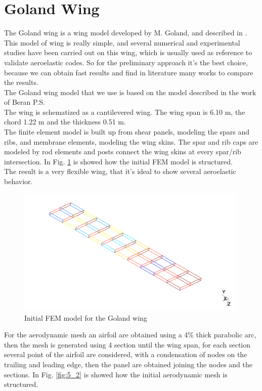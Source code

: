 \section{Goland Wing}
The Goland wing is a wing model developed by M. Goland, and described in \cite{gola}. This model of wing is really simple, and several numerical and experimental studies have been carried out on this wing, which is usually used as reference to validate aeroelastic codes. So for the preliminary approach it's the best choice, because we can obtain fast results and find in literature many works to compare the results.\\
The Goland wing model that we use is based on the model described in the work of Beran P.S. \cite{bera}\\
The wing is schematized as a cantilevered wing. The wing span is 6.10 m, the chord 1.22 m and the thickness 0.51 m.\\
The finite element model is built up from shear panels, modeling the spars and ribs, and membrane elements, modeling the wing skins. The spar and rib caps are modeled by rod elements and posts connect the wing skins at every spar/rib intersection.\cite{sito} In Fig. \ref{fig:5_1} is showed how the initial FEM model is structured.\\
The result is a very flexible wing, that it's ideal to show several aeroelastic behavior.\\
\begin{figure}[H]
	\centering
	\includegraphics[width = 1\textwidth]{./Immagini/5_1.png}
	\caption{Initial FEM model for the Goland wing}
	\label{fig:5_1}
\end{figure}
For the aerodynamic mesh an airfoil are obtained using a 4\% thick parabolic arc, then the mesh is generated using 4 section until the wing span, for each section several point of the airfoil are considered, with a condensation of nodes on the trailing and leading edge, then the panel are obtained joining the nodes and the sections. In Fig. \ref{fig:5_2} is showed how the initial aerodynamic mesh is structured.
